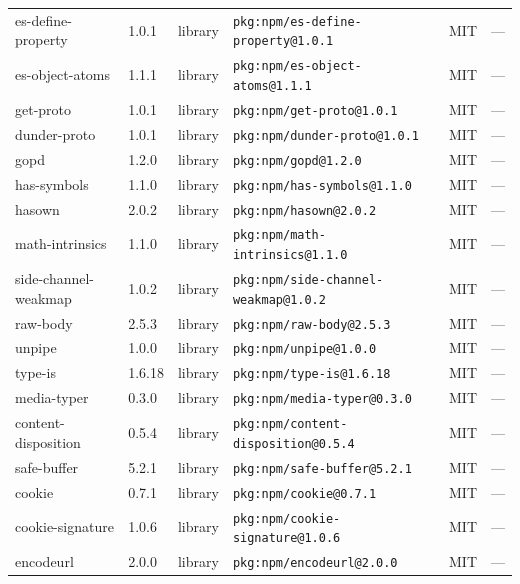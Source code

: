 \documentclass[11pt,a4paper]{article}
\begin{document}
\begin{longtable}{|p{4cm}|p{2cm}|p{1.6cm}|p{5cm}|p{1.5cm}|p{3.5cm}|}
\raggedright es-define-property & 1.0.1 & library & \small\texttt{pkg:npm/es-define-property@1.0.1} & MIT & \small — \\
\raggedright es-object-atoms & 1.1.1 & library & \small\texttt{pkg:npm/es-object-atoms@1.1.1} & MIT & \small — \\
\raggedright get-proto & 1.0.1 & library & \small\texttt{pkg:npm/get-proto@1.0.1} & MIT & \small — \\
\raggedright dunder-proto & 1.0.1 & library & \small\texttt{pkg:npm/dunder-proto@1.0.1} & MIT & \small — \\
\raggedright gopd & 1.2.0 & library & \small\texttt{pkg:npm/gopd@1.2.0} & MIT & \small — \\
\raggedright has-symbols & 1.1.0 & library & \small\texttt{pkg:npm/has-symbols@1.1.0} & MIT & \small — \\
\raggedright hasown & 2.0.2 & library & \small\texttt{pkg:npm/hasown@2.0.2} & MIT & \small — \\
\raggedright math-intrinsics & 1.1.0 & library & \small\texttt{pkg:npm/math-intrinsics@1.1.0} & MIT & \small — \\
\raggedright side-channel-weakmap & 1.0.2 & library & \small\texttt{pkg:npm/side-channel-weakmap@1.0.2} & MIT & \small — \\
\raggedright raw-body & 2.5.3 & library & \small\texttt{pkg:npm/raw-body@2.5.3} & MIT & \small — \\
\raggedright unpipe & 1.0.0 & library & \small\texttt{pkg:npm/unpipe@1.0.0} & MIT & \small — \\
\raggedright type-is & 1.6.18 & library & \small\texttt{pkg:npm/type-is@1.6.18} & MIT & \small — \\
\raggedright media-typer & 0.3.0 & library & \small\texttt{pkg:npm/media-typer@0.3.0} & MIT & \small — \\
\raggedright content-disposition & 0.5.4 & library & \small\texttt{pkg:npm/content-disposition@0.5.4} & MIT & \small — \\
\raggedright safe-buffer & 5.2.1 & library & \small\texttt{pkg:npm/safe-buffer@5.2.1} & MIT & \small — \\
\raggedright cookie & 0.7.1 & library & \small\texttt{pkg:npm/cookie@0.7.1} & MIT & \small — \\
\raggedright cookie-signature & 1.0.6 & library & \small\texttt{pkg:npm/cookie-signature@1.0.6} & MIT & \small — \\
\raggedright encodeurl & 2.0.0 & library & \small\texttt{pkg:npm/encodeurl@2.0.0} & MIT & \small — \\

\end{longtable}
\end{document}
